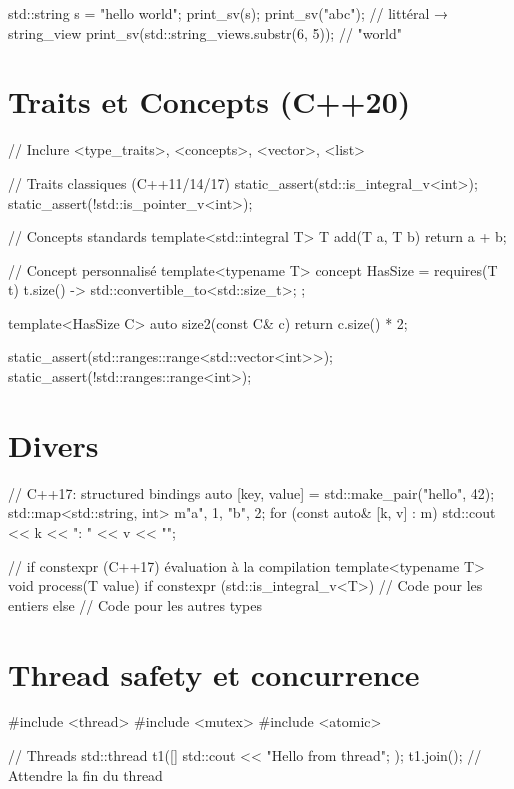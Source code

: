 \documentclass{article}
\begin{document}
\begin{multicols*}{4}
\begin{cppcode}
std::string s = "hello world";
print_sv(s);
print_sv("abc");                  // littéral → string_view
print_sv(std::string_view{s}.substr(6, 5)); // "world"
\end{cppcode}

\section*{Traits et Concepts (C++20)}

\begin{cppcode}
// Inclure <type_traits>, <concepts>, <vector>, <list>

// Traits classiques (C++11/14/17)
static_assert(std::is_integral_v<int>);
static_assert(!std::is_pointer_v<int>);

// Concepts standards
template<std::integral T>
T add(T a, T b) { return a + b; }

// Concept personnalisé
template<typename T>
concept HasSize = requires(T t) {
    { t.size() } -> std::convertible_to<std::size_t>;
};

template<HasSize C>
auto size2(const C& c) { return c.size() * 2; }

static_assert(std::ranges::range<std::vector<int>>);
static_assert(!std::ranges::range<int>);
\end{cppcode}

\section*{Divers}

\begin{cppcode}
// C++17: structured bindings
auto [key, value] = std::make_pair("hello", 42);
std::map<std::string, int> m{{"a", 1}, {"b", 2}};
for (const auto& [k, v] : m) {
    std::cout << k << ": " << v << "\n";
}

// if constexpr (C++17) évaluation à la compilation
template<typename T>
void process(T value) {
    if constexpr (std::is_integral_v<T>) {
        // Code pour les entiers
    } else {
        // Code pour les autres types
    }
}
\end{cppcode}

\section*{Thread safety et concurrence}
\begin{cppcode}
#include <thread>
#include <mutex>
#include <atomic>

// Threads
std::thread t1([]{ std::cout << "Hello from thread\n"; });
t1.join(); // Attendre la fin du thread


\end{cppcode}
\end{multicols*}
\end{document}
